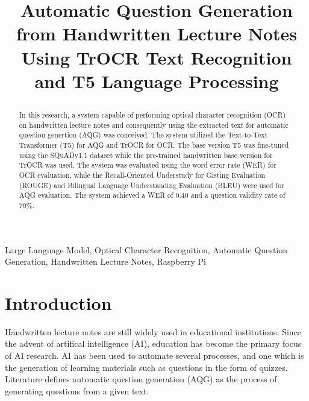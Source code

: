 \documentclass[conference]{IEEEtran}
\begin{document}
\title{Automatic Question Generation from Handwritten Lecture Notes Using TrOCR Text Recognition 
and T5 Language Processing\\
\author{
}
}

\maketitle

\begin{abstract}
In this research, a system capable of performing optical character recognition
(OCR) on handwritten lecture notes and consequently using the extracted text for
automatic question genertion (AQG) was conceived. The system utilized the Text-to-Text
Transformer (T5) for AQG and TrOCR for OCR. The base version T5 was fine-tuned
using the SQuADv1.1 dataset while the pre-trained handwritten base version for
TrOCR was used. The system was evaluated using the word error rate (WER) for
OCR evaluation, while the Recall-Oriented Understudy for Gisting Evaluation (ROUGE)
and Bilingual Language Understanding Evaluation (BLEU) were used for AQG evaluation. 
The system achieved a WER of 0.40 and a question validity rate of 70\%.
\end{abstract}

\begin{IEEEkeywords}
Large Language Model, Optical Character Recognition,
Automatic Question Generation, Handwritten Lecture Notes, Raspberry Pi
\end{IEEEkeywords}

\section{Introduction}
Handwritten lecture notes are still widely used in educational institutions.
Since the advent of artifical intelligence (AI), education has become
the primary focus of AI research. AI has been used to automate several processes,
and one which is the generation of learning materials such as questions in the
form of quizzes. Literature defines automatic question generation (AQG) as the
process of generating questions from a given text. 
\end{document}
